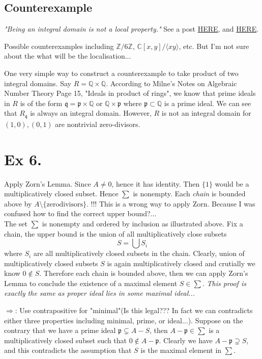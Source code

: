 \subsection{Counterexample}
\textit{"Being an integral domain is not a local property."} See a post \href{https://math.stackexchange.com/questions/685844/is-being-an-integral-domain-a-local-property}{HERE}, and \href{https://math.stackexchange.com/questions/2137643/being-an-integral-domain-is-not-a-local-property}{HERE}.

Possible counterexamples including $\mathbb Z/6\mathbb Z$, $\mathbb C[x,y]/\langle xy\rangle$, etc. 
But I'm not sure about the what will be the localisation... 


One very simple way to construct a counterexample to take product of two integral domains. 
Say $R=\mathbb Q\times\mathbb Q$. According to Milne's Notes on Algebraic Number Theory Page 15, "Ideals in product of rings", we know that prime ideals in $R$ is of the form $\mathfrak q=\mathfrak p\times \mathbb Q$ or $\mathbb Q\times\mathfrak p$ where $\mathfrak p\subset\mathbb Q$ is a prime ideal. We can see that $R_{\mathfrak q}$ is always an integral domain. However, $R$ is not an integral domain for $(1,0),(0,1)$ are nontrivial zero-divisors.

\section{Ex 6.}\label{Atiyah Chap 3 Ex 6.}

Apply Zorn's Lemma. Since $A\neq 0$, hence it has identity. Then $\{1\}$ would be a multiplicatively closed subset. Hence $\sum$ is nonempty. Each \textit{chain} is bounded above by $A\setminus\{\text{zerodivisors}\}$. !!!
This is a wrong way to apply Zorn. Because I was confused how to find the correct upper bound?...\\

The set $\sum$ is nonempty and ordered by inclusion as illustrated above. Fix a chain, the upper bound is the union of all multiplicatively close subsets \[S=\bigcup S_i\] where $S_i$ are all multiplicatively closed subsets in the chain. Clearly, union of multiplicatively closed subsets $S$ is again multiplicatively closed and crutially we know $0\notin S$. Therefore each chain is bounded above, then we can apply Zorn's Lemma to conclude the existence of a maximal element $S\in \sum$. \textit{This proof is exactly the same as proper ideal lies in some maximal ideal...}

$\Rightarrow$: Use contrapositive for "minimal"(Is this legal??? In fact we can contradicts either three properties including minimal, prime, or ideal...). Suppose on the contrary that we have a prime ideal $\mathfrak p\subsetneq A-S$, then $A-\mathfrak p\in \sum$ is a multiplicatively closed subset such that $0\notin A-\mathfrak p$. Clearly we have $A-\mathfrak p\supsetneq S$, and this contradicts the assumption that $S$ is the maximal element in $\sum$.


